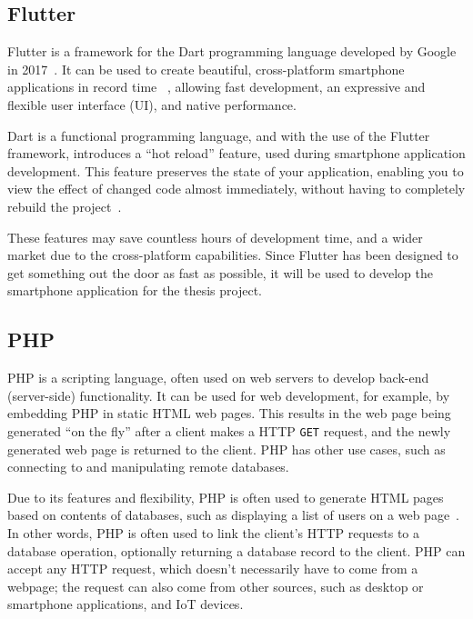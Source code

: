 \documentclass[12pt,openany,a4paper]{book}
\begin{document}

\subsection{Flutter}

Flutter is a framework for the Dart programming language developed by Google in
2017~\cite{bracken_2018}. It can be used to create beautiful, cross-platform
smartphone
applications in record time ~\cite{flutter_dev_intro}, allowing fast development, an expressive
and flexible user interface (UI), and native performance.

Dart is a functional programming language, and with the use of the Flutter framework,
introduces a ``hot reload'' feature, used during smartphone application development.
This feature preserves the state of your application, enabling you to view the
effect of changed code almost immediately, without having to completely rebuild
the project~\cite{flutter_dev_hot_reload}.

These features may save countless hours of development time, and a wider market
due to the cross-platform capabilities. Since Flutter has been designed to get
something out the door as fast as possible, it will be used to develop the
smartphone application for the thesis project.

\subsection{PHP}
\label{secn:php}

PHP is a scripting language, often used on web servers to develop back-end
(server-side) functionality. It can be used for web development, for example,
by embedding PHP in static HTML web pages. This results in the web page being
generated ``on the fly''
after a client makes a HTTP \verb|GET| request, and the newly generated web page
is returned to the client. PHP has other use cases, such as connecting to and
manipulating remote databases.

Due to its features and flexibility, PHP is often used to generate HTML pages
based on contents of databases, such as displaying a list of users on a web
page~\cite{php_intro}. In other words, PHP is often used to link the client's HTTP
requests to a database operation, optionally returning a database record to the
client. PHP can accept any HTTP request, which doesn't necessarily have to come
from a webpage; the request can also come from other sources, such as desktop
or smartphone applications, and IoT devices.
\end{document}
